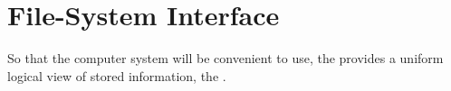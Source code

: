 \section{File-System Interface}\label{sec:FS_Interface}
So that the computer system will be convenient to use, the  provides a uniform logical view of stored information, the .



